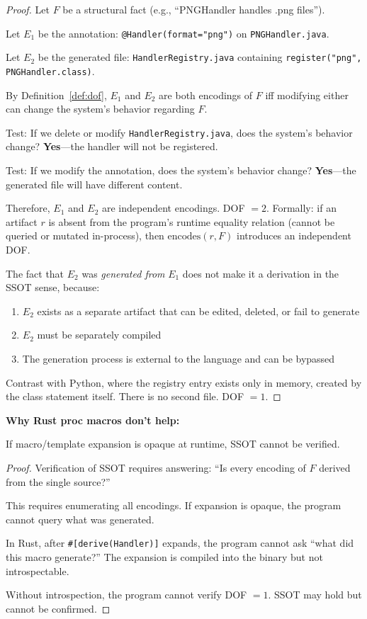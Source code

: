 \begin{proof}
Let $F$ be a structural fact (e.g., ``PNGHandler handles .png files'').

Let $E_1$ be the annotation: \texttt{@Handler(format="png")} on \texttt{PNGHandler.java}.

Let $E_2$ be the generated file: \texttt{HandlerRegistry.java} containing \texttt{register("png", PNGHandler.class)}.

By Definition~\ref{def:dof}, $E_1$ and $E_2$ are both encodings of $F$ iff modifying either can change the system's behavior regarding $F$.

Test: If we delete or modify \texttt{HandlerRegistry.java}, does the system's behavior change? \textbf{Yes}---the handler will not be registered.

Test: If we modify the annotation, does the system's behavior change? \textbf{Yes}---the generated file will have different content.

Therefore, $E_1$ and $E_2$ are independent encodings. DOF $= 2$.
Formally: if an artifact $r$ is absent from the program's runtime
equality relation (cannot be queried or mutated in-process), then
$\text{encodes}(r,F)$ introduces an independent DOF.

The fact that $E_2$ was \emph{generated from} $E_1$ does not make it a derivation in the SSOT sense, because:
\begin{enumerate}
\tightlist
\item $E_2$ exists as a separate artifact that can be edited, deleted, or fail to generate
\item $E_2$ must be separately compiled
\item The generation process is external to the language and can be bypassed
\end{enumerate}

Contrast with Python, where the registry entry exists only in memory, created by the class statement itself. There is no second file. DOF $= 1$.
\end{proof}

\textbf{Why Rust proc macros don't help:}

\begin{theorem}\label{thm:opaque-expansion}
If macro/template expansion is opaque at runtime, SSOT cannot be verified.
\end{theorem}

\begin{proof}
Verification of SSOT requires answering: ``Is every encoding of $F$ derived from the single source?''

This requires enumerating all encodings. If expansion is opaque, the program cannot query what was generated.

In Rust, after \texttt{\#[derive(Handler)]} expands, the program cannot ask ``what did this macro generate?'' The expansion is compiled into the binary but not introspectable.

Without introspection, the program cannot verify DOF $= 1$. SSOT may hold but cannot be confirmed.
\end{proof}

